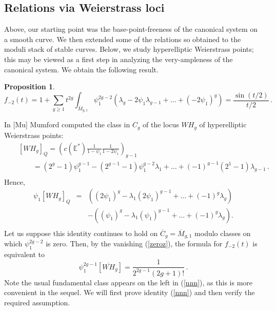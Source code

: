 \documentclass[11 pt]{amsart}
\newtheorem{pr}{Proposition}
\newcommand{\bpf}{\noindent {\em Proof.} }
\newcommand{\hodge}{\mathbb{E}}
\begin{document}
\subsection{Relations via Weierstrass loci}
Above, our starting point was the base-point-freeness of the canonical system
on a smooth curve. We then extended some of the relations so obtained to the
moduli stack of stable curves. Below, we study hyperelliptic Weierstrass
points; this may be viewed as a first step in analyzing the very-ampleness
of the canonical system. We obtain the following result.

\begin{pr} \label{hyp}
$$
f_{-2}(t)=1+\sum_{g\geq 1} t^{2g}
\int_{\overline{M}_{g,1}}\psi_1^{2g-2}(\lambda_g-2\psi_1\lambda_{g-1}
+\dots+(-2\psi_1)^g)=\frac{\sin(t/2)}{t/2}\,.
$$
\end{pr}

\bpf
In [Mu] Mumford computed the class in $C_g$ of the locus
$WH_g$ of hyperelliptic Weierstrass points:
\begin{eqnarray*}
&&[WH_g]_Q = \left(c(\hodge^*)
\frac1{1-\psi_1}\frac1{1-2\psi_1}\right)_{g-1} \\
&&\qquad
= (2^g-1)\psi_1^{g-1}-(2^{g-1}-1)\psi_1^{g-2}\lambda_1+\dots
+(-1)^{g-1}(2^1-1)\lambda_{g-1}\,.\\
\end{eqnarray*}
Hence,
\begin{eqnarray*}
\psi_1[WH_g]_Q &=& \left( (2\psi_1)^g-\lambda_1(2\psi_1)^{g-1}+\dots
+(-1)^g\lambda_g\right) \\
&&-\left( (\psi_1)^g-\lambda_1(\psi_1)^{g-1}+\dots 
+(-1)^g\lambda_g\right). \\
\end{eqnarray*}
Let us suppose this identity continues to hold on ${\overline{C}}_g
=\overline{M}_{g,1}$
modulo classes on which $\psi_1^{2g-2}$ is zero. Then,
by the vanishing (\ref{zeroz}), the formula
for $f_{-2}(t)$ is equivalent to
\begin{equation}
\label{nnn}
\psi_1^{2g-1}[{\overline{WH}}_g]=\frac1{2^{2g-1}(2g+1)!}\,.
\end{equation}
Note 
the usual fundamental class appears on the left in (\ref{nnn}), 
as this is more
convenient in the sequel.
We will first prove identity (\ref{nnn}) and then verify the 
required assumption.
\end{document}
